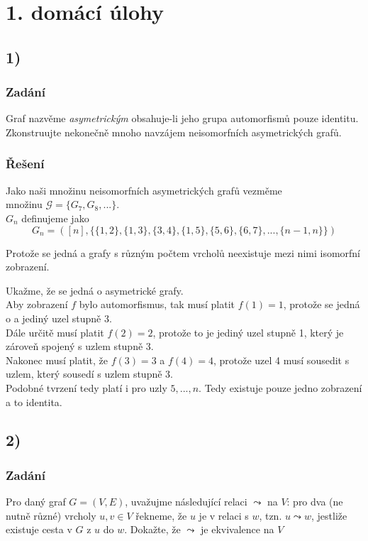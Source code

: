 \documentclass[../main.tex]{subfiles}
\begin{document}
\section*{1. domácí úlohy}

\subsection*{1)}
\subsubsection*{Zadání}
Graf nazvěme \textit{asymetrickým} obsahuje-li jeho grupa automorfismů pouze identitu.
Zkonstruujte nekonečně mnoho navzájem neisomorfních asymetrických grafů.
\subsubsection*{Řešení}
Jako naši množinu neisomorfních asymetrických grafů vezměme\\ množinu $\mathcal{G} = \{G_7, G_8, ...\}$.\\
$G_n$ definujeme jako
\begin{equation*}
    G_n = ([n], \{\{ 1,2 \}, \{ 1,3\}, \{ 3,4 \}, \{ 1,5 \}, \{ 5,6 \}, \{ 6,7 \}, ..., \{ n-1, n \} \} )
\end{equation*}

Protože se jedná a grafy s různým počtem vrcholů neexistuje mezi nimi isomorfní zobrazení. 

Ukažme, že se jedná o asymetrické grafy.\\
Aby zobrazení $f$ bylo automorfismus, tak musí platit $f(1) = 1$, protože se jedná o a jediný uzel stupně 3.\\
Dále určitě musí platit $f(2) = 2$, protože to je jediný uzel stupně 1, který je zároveň spojený s uzlem stupně 3.\\
Nakonec musí platit, že $f(3) = 3$ a $f(4) = 4$, protože uzel 4 musí sousedit s uzlem, který sousedí s uzlem stupně 3.\\
Podobné tvrzení tedy platí i pro uzly $5, ..., n$. Tedy existuje pouze jedno zobrazení a to identita. 




\subsection*{2)}
\subsubsection*{Zadání}
Pro daný graf $G=(V,E)$, uvažujme následující relaci $\leadsto$ na $V$: pro dva (ne nutně různé) vrcholy $u,v\in V$ řekneme, že 
$u$ je v relaci s $w$, tzn. $u\leadsto w$, jestliže existuje cesta v $G$ z $u$ do $w$. Dokažte, že $\leadsto$ je ekvivalence na $V$
\end{document}
